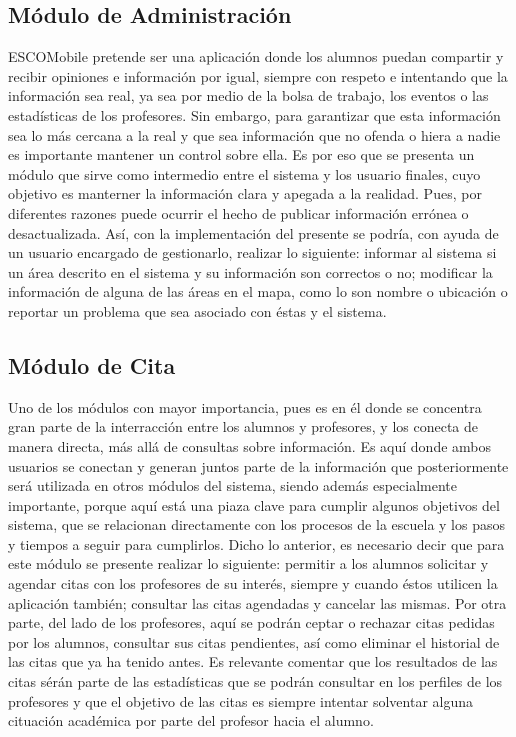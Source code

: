 \subsection{Módulo de Administración}
\noindent
ESCOMobile pretende ser una aplicación donde los alumnos puedan compartir y recibir opiniones e información por igual, siempre con respeto e intentando que la información sea real, ya sea por medio de la bolsa de trabajo, los eventos o las estadísticas de los profesores. Sin embargo, para garantizar que esta información sea lo más cercana a la real y que sea información que no ofenda o hiera a nadie es importante mantener un control sobre ella. Es por eso que se presenta un módulo que sirve como intermedio entre el sistema y los usuario finales, cuyo objetivo es manterner la información clara y apegada a la realidad. Pues, por diferentes razones puede ocurrir el hecho de publicar información errónea o desactualizada. Así, con la implementación del presente se podría, con ayuda de un usuario encargado de gestionarlo, realizar lo siguiente: informar al sistema si un área descrito en el sistema y su información son correctos o no; modificar la información de alguna de las áreas en el mapa, como lo son nombre o ubicación o reportar un problema que sea asociado con éstas y el sistema.  \\ 

\subsection{Módulo de Cita}
\noindent
Uno de los módulos con mayor importancia, pues es en él donde se concentra gran parte de la interracción entre los alumnos y profesores, y los conecta de manera directa, más allá de consultas sobre información. Es aquí donde ambos usuarios se conectan y generan juntos parte de la información que posteriormente será utilizada en otros módulos del sistema, siendo además especialmente importante, porque aquí está una piaza clave para cumplir algunos objetivos del sistema, que se relacionan directamente con los procesos de la escuela y los pasos y tiempos a seguir para cumplirlos. Dicho lo anterior, es necesario decir que para este módulo se presente realizar lo siguiente: permitir a los alumnos solicitar y agendar citas con los profesores de su interés, siempre y cuando éstos utilicen la aplicación también; consultar las citas agendadas y cancelar las mismas. Por otra parte, del lado de los profesores, aquí se podrán ceptar o rechazar citas pedidas por los alumnos, consultar sus citas pendientes, así como eliminar el historial de las citas que ya ha tenido antes. Es relevante comentar que los resultados de las citas sérán parte de las estadísticas que se podrán consultar en los perfiles de los profesores y que el objetivo de las citas es siempre intentar solventar alguna cituación académica por parte del profesor hacia el alumno. \\

